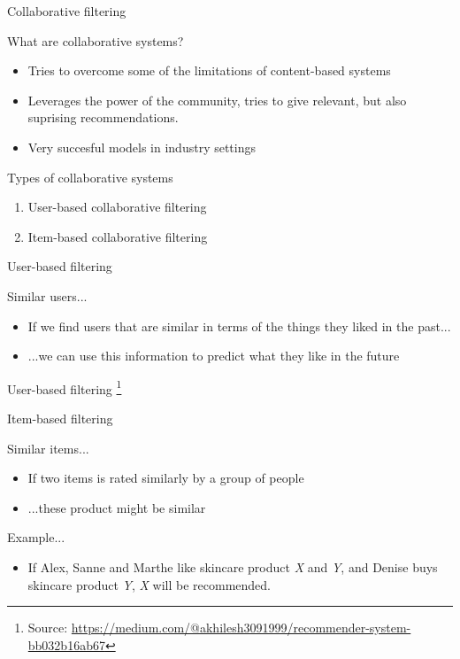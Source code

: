 \begin{frame}{Collaborative filtering}  
\begin{block}{What are collaborative systems?}
	\begin{itemize}
	\item <1-> Tries to overcome some of the limitations of content-based systems
	\item <2->Leverages the power of the community, tries to give relevant, but also suprising recommendations. 
	\item <3-> Very succesful models in industry settings
\end{itemize}
\end{block}
\begin{alertblock}{Types of collaborative systems}
	\begin{enumerate}
		\item User-based collaborative filtering
		\item Item-based collaborative filtering 
	\end{enumerate}
\end{alertblock}
\end{frame}

\begin{frame}{User-based filtering}  
	\begin{block}{Similar users...}
		\begin{itemize}
			\item<1->If we find users that are similar in terms of the things they liked in the past...
			\item<2->...we can use this information to predict what they like in the future
		\end{itemize}
	\end{block}
\end{frame}

\begin{frame}{User-based filtering}
	\footnote{Source: \url{https://medium.com/@akhilesh3091999/recommender-system-bb032b16ab67}}
\end{frame}

\begin{frame}{Item-based filtering}  
	\begin{block}{Similar items...}
		\begin{itemize}
			\item<1->If two items is rated similarly by a group of people
			\item<2->...these product might be similar
		\end{itemize}
	\end{block}
		\begin{exampleblock}{Example...}
			\begin{itemize}
			\item If Alex, Sanne and Marthe like skincare product \textit{X} and \textit{Y}, and Denise buys skincare product  \textit{Y},  \textit{X} will be recommended. 
			\end{itemize}
		\end{exampleblock}
\end{frame}


